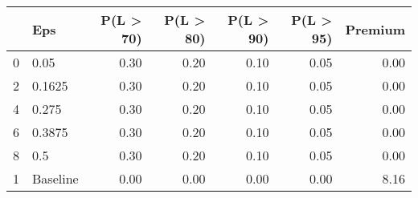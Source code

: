 \begin{tabular}{llrrrrr}
\toprule
{} &       Eps &  P(L > 70) &  P(L > 80) &  P(L > 90) &  P(L > 95) &  Premium \\
\midrule
0 &      0.05 &       0.30 &       0.20 &       0.10 &       0.05 &     0.00 \\
2 &    0.1625 &       0.30 &       0.20 &       0.10 &       0.05 &     0.00 \\
4 &     0.275 &       0.30 &       0.20 &       0.10 &       0.05 &     0.00 \\
6 &    0.3875 &       0.30 &       0.20 &       0.10 &       0.05 &     0.00 \\
8 &       0.5 &       0.30 &       0.20 &       0.10 &       0.05 &     0.00 \\
1 &  Baseline &       0.00 &       0.00 &       0.00 &       0.00 &     8.16 \\
\bottomrule
\end{tabular}
